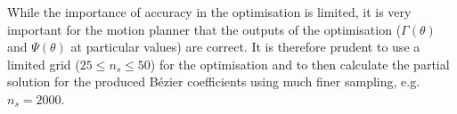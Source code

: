 While the importance of accuracy in the optimisation is limited, it is very important for the motion planner that the outputs of the optimisation ($\Gamma(\theta)$ and $\Psi(\theta)$ at particular values) are correct. It is therefore prudent to use a limited grid ($25 \leq n_s \leq 50$) for the optimisation and to then calculate the partial solution for the produced Bézier coefficients using much finer sampling, e.g. $n_s = 2000$. 